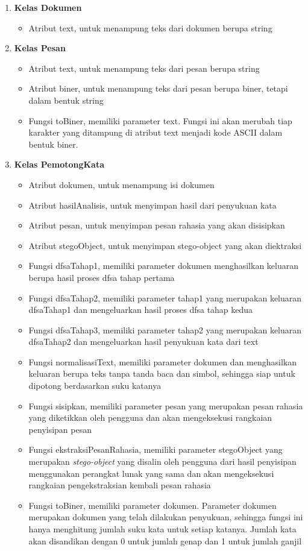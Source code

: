 \begin{enumerate}
	\item \textbf{Kelas Dokumen}
	\begin{itemize}
		\item Atribut text, untuk menampung teks dari dokumen berupa string
	\end{itemize}
	\item \textbf{Kelas Pesan}
	\begin{itemize}
		\item Atribut text, untuk menampung teks dari pesan berupa string
		\item Atribut biner, untuk menampung teks dari pesan berupa biner, tetapi dalam bentuk string
		\item Fungsi toBiner, memiliki parameter text. Fungsi ini akan merubah tiap karakter yang ditampung di atribut text menjadi kode ASCII dalam bentuk biner.
	\end{itemize}
	\item \textbf{Kelas PemotongKata}
	\begin{itemize}
		\item Atribut dokumen, untuk menampung isi dokumen
		\item Atribut hasilAnalisis, untuk menyimpan hasil dari penyukuan kata
		\item Atribut pesan, untuk menyimpan pesan rahasia yang akan disisipkan
		\item Atribut stegoObject, untuk menyimpan stego-object yang akan diektraksi
		\item Fungsi dfsaTahap1, memiliki parameter dokumen menghasilkan keluaran berupa hasil proses dfsa tahap pertama
		\item Fungsi dfsaTahap2, memiliki parameter tahap1 yang merupakan keluaran dfsaTahap1 dan mengeluarkan hasil proses dfsa tahap kedua
		\item Fungsi dfsaTahap3, memiliki parameter tahap2 yang merupakan keluaran dfsaTahap2 dan mengeluarkan hasil penyukuan kata dari text
		\item Fungsi normalisasiText, memiliki parameter dokumen dan menghasilkan keluaran berupa teks tanpa tanda baca dan simbol, sehingga siap untuk dipotong berdasarkan suku katanya
		\item Fungsi sisipkan, memiliki parameter pesan yang merupakan pesan rahasia yang diketikkan oleh pengguna dan akan mengeksekusi rangkaian penyisipan pesan
		\item Fungsi ekstraksiPesanRahasia, memiliki parameter stegoObject yang merupakan \textit{stego-object} yang disalin oleh pengguna dari hasil penyisipan menggunakan perangkat lunak yang sama dan akan mengeksekusi rangkaian pengekstraksian kembali pesan rahasia
		\item Fungsi toBiner, memiliki parameter dokumen. Parameter dokumen merupakan dokumen yang telah dilakukan penyukuan, sehingga fungsi ini hanya menghitung jumlah suku kata untuk setiap katanya. Jumlah kata akan disandikan dengan 0 untuk jumlah genap dan 1 untuk jumlah ganjil
	\end{itemize}
\end{enumerate}
